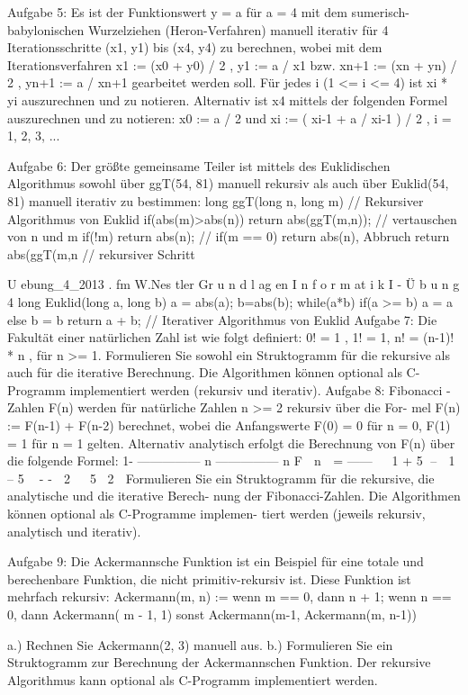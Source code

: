 Aufgabe 5: Es ist der Funktionswert y = a für a = 4 mit dem sumerisch-babylonischen
Wurzelziehen (Heron-Verfahren) manuell iterativ für 4 Iterationsschritte (x1, y1) bis (x4, y4)
zu berechnen, wobei mit dem Iterationsverfahren
x1 := (x0 + y0) / 2 , y1 := a / x1 bzw. xn+1 := (xn + yn) / 2 , yn+1 := a / xn+1
gearbeitet werden soll. Für jedes i (1 <= i <= 4) ist xi * yi auszurechnen und zu notieren.
Alternativ ist x4 mittels der folgenden Formel auszurechnen und zu notieren:
x0 := a / 2 und xi := ( xi-1 + a / xi-1 ) / 2 , i = 1, 2, 3, ...

Aufgabe 6: Der größte gemeinsame Teiler ist mittels des Euklidischen Algorithmus sowohl
über ggT(54, 81) manuell rekursiv als auch über Euklid(54, 81) manuell iterativ zu bestimmen:
long ggT(long n, long m){
// Rekursiver Algorithmus von Euklid
if(abs(m)>abs(n)) return abs(ggT(m,n)); // vertauschen von n und m
if(!m) return abs(n);
// if(m == 0) return abs(n), Abbruch
return abs(ggT(m,n%
// rekursiver Schritt
}

U ebung_4_2013 . fm
W.Nes tler
Gr u n d l ag en I n f o r m at i k I - Ü b u n g 4
long Euklid(long a, long b){
a = abs(a); b=abs(b);
while(a*b){
if(a >= b) a = a %
else b = b %
}
return a + b;
}
// Iterativer Algorithmus von Euklid
Aufgabe 7: Die Fakultät einer natürlichen Zahl ist wie folgt definiert: 0! = 1 , 1! = 1,
n! = (n-1)! * n , für n >= 1. Formulieren Sie sowohl ein Struktogramm für die rekursive als auch
für die iterative Berechnung. Die Algorithmen können optional als C-Programm implementiert
werden (rekursiv und iterativ).
Aufgabe 8: Fibonacci - Zahlen F(n) werden für natürliche Zahlen n >= 2 rekursiv über die For-
mel F(n) := F(n-1) + F(n-2) berechnet, wobei die Anfangswerte F(0) = 0 für n = 0, F(1) = 1 für
n = 1 gelten. Alternativ analytisch erfolgt die Berechnung von F(n) über die folgende Formel:
1- --------------- n --------------- n
F  n  = ------   1 + 5 –  1 – 5 
-
-
 2  
5 2 
Formulieren Sie ein Struktogramm für die rekursive, die analytische und die iterative Berech-
nung der Fibonacci-Zahlen. Die Algorithmen können optional als C-Programme implemen-
tiert werden (jeweils rekursiv, analytisch und iterativ).

Aufgabe 9: Die Ackermannsche Funktion ist ein Beispiel für eine totale und berechenbare
Funktion, die nicht primitiv-rekursiv ist. Diese Funktion ist mehrfach rekursiv:
Ackermann(m, n) := wenn m == 0, dann n + 1;
wenn n == 0, dann Ackermann( m - 1, 1)
sonst Ackermann(m-1, Ackermann(m, n-1))

a.) Rechnen Sie Ackermann(2, 3) manuell aus.
b.) Formulieren Sie ein Struktogramm zur Berechnung der Ackermannschen Funktion.
Der rekursive Algorithmus kann optional als C-Programm implementiert werden.

